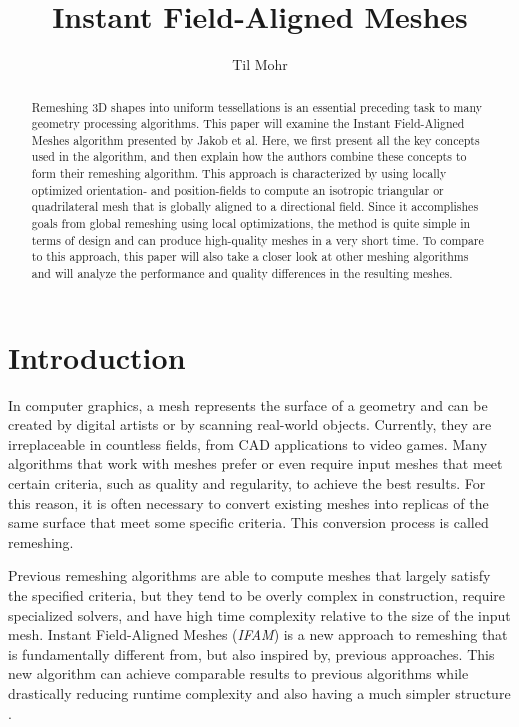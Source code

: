 \documentclass{ACGSeminar}
\begin{document}
\title{Instant Field-Aligned Meshes}

\author{Til Mohr}


\maketitle


\begin{abstract}
Remeshing 3D shapes into uniform tessellations is an essential preceding task to many geometry processing algorithms. This paper will examine the Instant Field-Aligned Meshes algorithm presented by Jakob et al. Here, we first present all the key concepts used in the algorithm, and then explain how the authors combine these concepts to form their remeshing algorithm. This approach is characterized by using locally optimized orientation- and position-fields to compute an isotropic triangular or quadrilateral mesh that is globally aligned to a directional field. Since it accomplishes goals from global remeshing using local optimizations, the method is quite simple in terms of design and can produce high-quality meshes in a very short time. To compare to this approach, this paper will also take a closer look at other meshing algorithms and will analyze the performance and quality differences in the resulting meshes.
\end{abstract}

\tableofcontents

\newpage

\section{Introduction}
In computer graphics, a mesh represents the surface of a geometry and can be created by digital artists or by scanning real-world objects. Currently, they are irreplaceable in countless fields, from CAD applications to video games. Many algorithms that work with meshes prefer or even require input meshes that meet certain criteria, such as quality and regularity, to achieve the best results. For this reason, it is often necessary to convert existing meshes into replicas of the same surface that meet some specific criteria. This conversion process is called remeshing.\bigskip

Previous remeshing algorithms are able to compute meshes that largely satisfy the specified criteria, but they tend to be overly complex in construction, require specialized solvers, and have high time complexity relative to the size of the input mesh. Instant Field-Aligned Meshes (\textit{IFAM}) is a new approach to remeshing that is fundamentally different from, but also inspired by, previous approaches. This new algorithm can achieve comparable results to previous algorithms while drastically reducing runtime complexity and also having a much simpler structure \cite{jakob2015instant}.\bigskip
\end{document}

